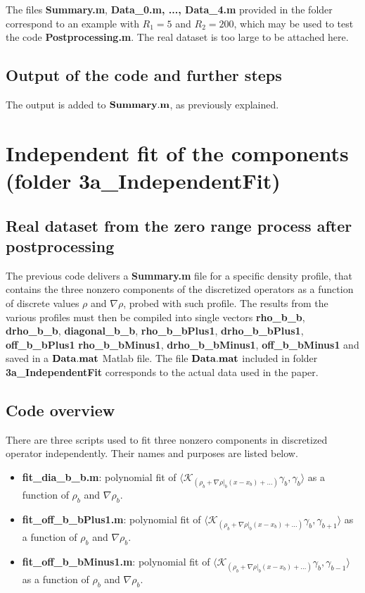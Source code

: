 \documentclass[authoryear,3p,11pt]{elsarticle}
\begin{document}
The files {\bf Summary.m}, {\bf Data\_0.m, ..., Data\_4.m} provided in the folder correspond to an example with $R_1=5$ and $R_2=200$, which may be used to test the code {\bf Postprocessing.m}. The real dataset is too large to be attached here. 

\subsection{Output of the code and further steps} 
The output is added to $\bf Summary.m$, as previously explained.

\section{Independent fit of the components (folder 3a\_IndependentFit)} \label{Sec:IndepFit}

\subsection{Real dataset from the zero range process after postprocessing} \label{Sec:IndepFitData}

The previous code delivers a {\bf Summary.m} file for a specific density profile, that contains the three nonzero components of the discretized operators as a function of discrete values $\rho$ and $\nabla \rho$, probed with such profile. The results from the various profiles must then be compiled into single vectors {\bf rho\_b\_b},  {\bf drho\_b\_b}, {\bf diagonal\_b\_b}, {\bf rho\_b\_bPlus1}, {\bf drho\_b\_bPlus1}, {\bf off\_b\_bPlus1}  {\bf rho\_b\_bMinus1}, {\bf drho\_b\_bMinus1}, {\bf off\_b\_bMinus1} and saved in a  $\bf Data.mat$  Matlab file. The file $\bf Data.mat$ included in folder {\bf 3a\_IndependentFit} corresponds to the actual data used in the paper.

\subsection{Code overview} 
There are three scripts used to fit three nonzero components in discretized operator independently. Their names and purposes are listed below.
\begin{itemize}
\item {\bf fit\_dia\_b\_b.m}: polynomial fit of $\langle  \mathcal{K}_{\left(\rho_b+ \nabla \rho|_b (x-x_b) +\ldots\right)}\gamma_b,\gamma_b \rangle$ as a function of $\rho_b$ and $\nabla \rho_b$.
\item {\bf fit\_off\_b\_bPlus1.m}: polynomial fit of $\langle  \mathcal{K}_{\left(\rho_b+ \nabla \rho|_b (x-x_b) +\ldots\right)}\gamma_b,\gamma_{b+1} \rangle$ as a function of  $\rho_b$ and $\nabla \rho_b$.
\item {\bf fit\_off\_b\_bMinus1.m}: polynomial fit of $\langle  \mathcal{K}_{\left(\rho_b+ \nabla \rho|_b (x-x_b) +\ldots\right)}\gamma_b,\gamma_{b-1} \rangle$ as a function of $\rho_b$ and $\nabla \rho_b$.
\end{itemize}
\end{document}
